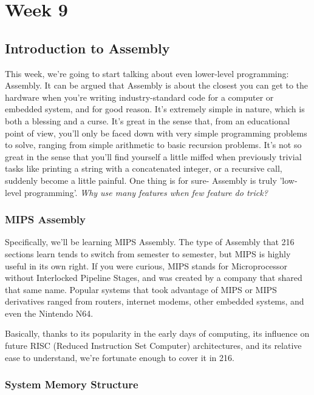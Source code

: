 \documentclass[english, 10pt]{article}
\begin{document}
\section{Week 9}

\subsection{Introduction to Assembly}

This week, we're going to start talking about even lower-level programming: Assembly. It can be argued that Assembly is about the closest you can get to the hardware when you're writing industry-standard code for a computer or embedded system, and for good reason. It's extremely simple in nature, which is both a blessing and a curse. It's great in the sense that, from an educational point of view, you'll only be faced down with very simple programming problems to solve, ranging from simple arithmetic to basic recursion problems. It's not so great in the sense that you'll find yourself a little miffed when previously trivial tasks like printing a string with a concatenated integer, or a recursive call, suddenly become a little painful. One thing is for sure- Assembly is truly 'low-level programming'. \textit{Why use many features when few feature do trick?}

\subsubsection{MIPS Assembly}

Specifically, we'll be learning MIPS Assembly. The type of Assembly that 216 sections learn tends to switch from semester to semester, but MIPS is highly useful in its own right. If you were curious, MIPS stands for Microprocessor without Interlocked Pipeline Stages, and was created by a company that shared that same name. Popular systems that took advantage of MIPS or MIPS derivatives ranged from routers, internet modems, other embedded systems, and even the Nintendo N64.\newline

Basically, thanks to its popularity in the early days of computing, its influence on future RISC (Reduced Instruction Set Computer) architectures, and its relative ease to understand, we're fortunate enough to cover it in 216.

\subsubsection{System Memory Structure}
\end{document}
